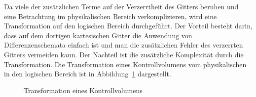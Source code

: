 Da viele der zusätzlichen Terme auf der Verzerrtheit des Gitters beruhen und eine
Betrachtung im physikalischen Bereich verkomplizieren, wird eine Transformation auf
den logischen Bereich durchgeführt. Der Vorteil besteht darin, dass auf dem dortigen kartesischen
Gitter die Anwendung von Differenzenschemata einfach ist und man die zusätzlichen Fehler des
verzerrten Gitters vermeiden kann. Der Nachteil ist die zusätzliche Komplexität durch
die Transformation. Die Transformation eines Kontrollvolumens vom physikalischen in
den logischen Bereich ist in Abbildung~\ref{fig:no-trans} dargestellt.
\begin{figure}[ht]
  
\centering
\caption{Transformation eines Kontrollvolumens}
\label{fig:no-trans}
\end{figure}

